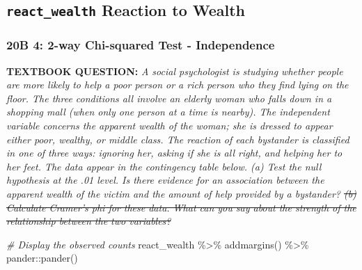 \documentclass[
]{article}
\newenvironment{Shaded}{\begin{snugshade}}{\end{snugshade}}
\newcommand{\CommentTok}[1]{\textcolor[rgb]{0.56,0.35,0.01}{\textit{#1}}}
\newcommand{\FunctionTok}[1]{\textcolor[rgb]{0.00,0.00,0.00}{#1}}
\newcommand{\NormalTok}[1]{#1}
\newcommand{\SpecialCharTok}[1]{\textcolor[rgb]{0.00,0.00,0.00}{#1}}
\begin{document}
\clearpage

\hypertarget{react_wealth-reaction-to-wealth}{%
\subsection{\texorpdfstring{\texttt{react\_wealth} Reaction to
Wealth}{react\_wealth Reaction to Wealth}}\label{react_wealth-reaction-to-wealth}}

\hypertarget{b-4-2-way-chi-squared-test---independence}{%
\subsubsection{20B 4: 2-way Chi-squared Test -
Independence}\label{b-4-2-way-chi-squared-test---independence}}

\textbf{TEXTBOOK QUESTION:} \emph{A social psychologist is studying
whether people are more likely to help a poor person or a rich person
who they find lying on the floor. The three conditions all involve an
elderly woman who falls down in a shopping mall (when only one person at
a time is nearby). The independent variable concerns the apparent wealth
of the woman; she is dressed to appear either poor, wealthy, or middle
class. The reaction of each bystander is classified in one of three
ways: ignoring her, asking if she is all right, and helping her to her
feet. The data appear in the contingency table below. (a) Test the null
hypothesis at the .01 level. Is there evidence for an association
between the apparent wealth of the victim and the amount of help
provided by a bystander? \sout{(b) Calculate Cramer's phi for these
data. What can you say about the strength of the relationship between
the two variables?}}

\begin{Shaded}
\begin{Highlighting}[]
\CommentTok{\# Display the observed counts}
\NormalTok{react\_wealth }\SpecialCharTok{\%\textgreater{}\%} 
  \FunctionTok{addmargins}\NormalTok{() }\SpecialCharTok{\%\textgreater{}\%} 
\NormalTok{  pander}\SpecialCharTok{::}\FunctionTok{pander}\NormalTok{()}
\end{Highlighting}
\end{Shaded}
\end{document}
